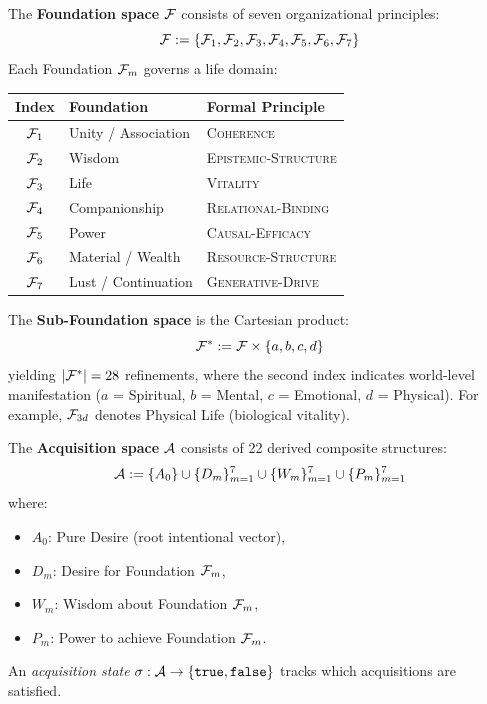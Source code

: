 \begin{definition}[Foundations]
\label{def:core-foundations}
The \textbf{Foundation space} $\mathcal{F}$ consists of seven organizational principles:
\[
    \mathcal{F} := \{\mathcal{F}_1, \mathcal{F}_2, \mathcal{F}_3, \mathcal{F}_4,
                      \mathcal{F}_5, \mathcal{F}_6, \mathcal{F}_7\}
\]
Each Foundation $\mathcal{F}_m$ governs a life domain:
\begin{center}
\begin{tabular}{cll}
\toprule
\textbf{Index} & \textbf{Foundation} & \textbf{Formal Principle} \\
\midrule
$\mathcal{F}_1$ & Unity / Association & \textsc{Coherence} \\
$\mathcal{F}_2$ & Wisdom & \textsc{Epistemic-Structure} \\
$\mathcal{F}_3$ & Life & \textsc{Vitality} \\
$\mathcal{F}_4$ & Companionship & \textsc{Relational-Binding} \\
$\mathcal{F}_5$ & Power & \textsc{Causal-Efficacy} \\
$\mathcal{F}_6$ & Material / Wealth & \textsc{Resource-Structure} \\
$\mathcal{F}_7$ & Lust / Continuation & \textsc{Generative-Drive} \\
\bottomrule
\end{tabular}
\end{center}
\end{definition}

\begin{definition}
\label{def:core-subfoundations}
The \textbf{Sub-Foundation space} is the Cartesian product:
\[
    \mathcal{F}^* := \mathcal{F} \times \{a, b, c, d\}
\]
yielding $|\mathcal{F}^*| = 28$ refinements, where the second index indicates
world-level manifestation ($a$ = Spiritual, $b$ = Mental, $c$ = Emotional, $d$ = Physical).
For example, $\mathcal{F}_{3d}$ denotes Physical Life (biological vitality).
\end{definition}

\begin{definition}[Acquisitions]
\label{def:core-acquisitions}
The \textbf{Acquisition space} $\mathcal{A}$ consists of 22 derived composite structures:
\[
    \mathcal{A} := \{A_0\} \cup \{D_m\}_{m=1}^{7} \cup \{W_m\}_{m=1}^{7}
                     \cup \{P_m\}_{m=1}^{7}
\]
where:
\begin{itemize}
    \item $A_0$: Pure Desire (root intentional vector),
    \item $D_m$: Desire for Foundation $\mathcal{F}_m$,
    \item $W_m$: Wisdom about Foundation $\mathcal{F}_m$,
    \item $P_m$: Power to achieve Foundation $\mathcal{F}_m$.
\end{itemize}
An \emph{acquisition state} $\sigma : \mathcal{A} \to \{\mathtt{true}, \mathtt{false}\}$
tracks which acquisitions are satisfied.
\end{definition}

